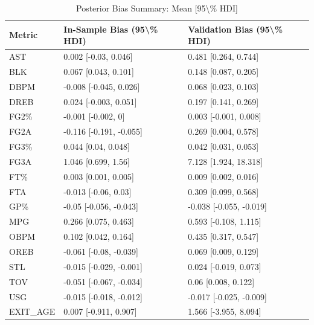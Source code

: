 \begin{table}[t]
\caption*{
{\fontsize{20}{25}\selectfont  Posterior Bias Summary: Mean [95\textbackslash{}\% HDI]\fontsize{12}{15}\selectfont }
} 
\fontsize{12.0pt}{14.0pt}\selectfont
\begin{tabular*}{\linewidth}{@{\extracolsep{\fill}}lll}
\toprule
Metric & In-Sample Bias (95\textbackslash{}\% HDI) & Validation Bias (95\textbackslash{}\% HDI) \\ 
\midrule\addlinespace[2.5pt]
AST & 0.002 [-0.03, 0.046] & 0.481 [0.264, 0.744] \\ 
BLK & 0.067 [0.043, 0.101] & 0.148 [0.087, 0.205] \\ 
DBPM & -0.008 [-0.045, 0.026] & 0.068 [0.023, 0.103] \\ 
DREB & 0.024 [-0.003, 0.051] & 0.197 [0.141, 0.269] \\ 
FG2\% & -0.001 [-0.002, 0] & 0.003 [-0.001, 0.008] \\ 
FG2A & -0.116 [-0.191, -0.055] & 0.269 [0.004, 0.578] \\ 
FG3\% & 0.044 [0.04, 0.048] & 0.042 [0.031, 0.053] \\ 
FG3A & 1.046 [0.699, 1.56] & 7.128 [1.924, 18.318] \\ 
FT\% & 0.003 [0.001, 0.005] & 0.009 [0.002, 0.016] \\ 
FTA & -0.013 [-0.06, 0.03] & 0.309 [0.099, 0.568] \\ 
GP\% & -0.05 [-0.056, -0.043] & -0.038 [-0.055, -0.019] \\ 
MPG & 0.266 [0.075, 0.463] & 0.593 [-0.108, 1.115] \\ 
OBPM & 0.102 [0.042, 0.164] & 0.435 [0.317, 0.547] \\ 
OREB & -0.061 [-0.08, -0.039] & 0.069 [0.009, 0.129] \\ 
STL & -0.015 [-0.029, -0.001] & 0.024 [-0.019, 0.073] \\ 
TOV & -0.051 [-0.067, -0.034] & 0.06 [0.008, 0.122] \\ 
USG & -0.015 [-0.018, -0.012] & -0.017 [-0.025, -0.009] \\ 
EXIT\_AGE & 0.007 [-0.911, 0.907] & 1.566 [-3.955, 8.094] \\ 
\bottomrule
\end{tabular*}
\end{table}

